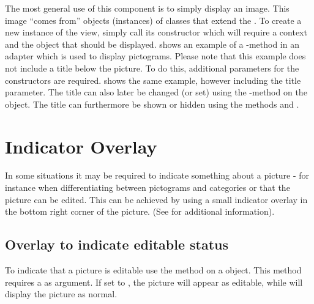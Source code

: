 \noindent
The most general use of this component is to simply display an image. This image ``comes from'' objects (instances) of classes that extend the . To create a new instance of the view, simply call its constructor which will require a context and the object that should be displayed.  shows an example of a -method in an adapter which is used to display pictograms. Please note that this example does not include a title below the picture. To do this, additional parameters for the constructors are required.  shows the same example, however including the title parameter. The title can also later be changed (or set) using the -method on the  object. The title can furthermore be shown or hidden using the methods  and .
 
 

 


\section{Indicator Overlay}
\label{sec:indicator_overlay}
In some situations it may be required to indicate something about a picture - for instance when differentiating between pictograms and categories or that the picture can be edited. This can be achieved by using a small indicator overlay in the bottom right corner of the picture. (See  for additional information). 

\subsection{Overlay to indicate editable status}
To indicate that a picture is editable use the method  on a  object. This method requires a  as argument. If set to , the picture will appear as editable, while  will display the picture as normal.

